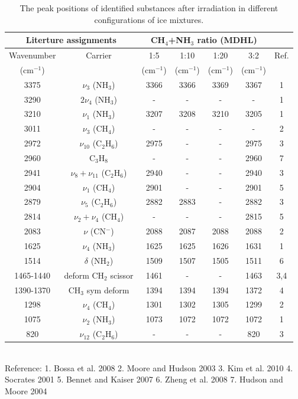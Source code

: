 \begin{table}[htbp]
\caption{The peak positions of identified substances after irradiation in different configurations of ice mixtures.}
\label{tab:WavenumberMDHL}
\begin{tabular}{ccccccc}
\hline
\hline
\multicolumn{2}{c}{Literture assignments} & \multicolumn{4}{c}{CH$_4$+NH$_3$ ratio (MDHL)} &  \\
\hline
Wavenumber & Carrier  & 1:5  & 1:10  & 1:20  & 3:2  & Ref. \\
(cm$^{-1}$) &   & (cm$^{-1}$) & (cm$^{-1}$) & (cm$^{-1}$) & (cm$^{-1}$) &\\
\hline
3375 & $\nu_3$ (NH$_3$) & 3366 & 3366 & 3369 & 3367 & 1 \\
3290 & $2\nu_4$ (NH$_3$) & - & - & - & - & 1 \\
3210 & $\nu_1$ (NH$_3$) & 3207 & 3208 & 3210 & 3205 & 1 \\
3011 & $\nu_3$ (CH$_4$) & - & - & - & - & 2 \\
2972 & $\nu_{10}$ (C$_2$H$_6$) & 2975 & - & - & 2975 & 3 \\
2960 & C$_3$H$_8$ & - & - & - & 2960 & 7 \\
2941 & $\nu_8+\nu_11$ (C$_2$H$_6$) & 2940 & - & - & 2940 & 3 \\
2904 & $\nu_1$ (CH$_4$) & 2901 & - & - & 2901 & 5 \\
2879 & $\nu_5$ (C$_2$H$_6$) & 2882 & 2883 & - & 2882 & 3 \\
2814 & $\nu_2+\nu_4$ (CH$_4$) & - & - & - & 2815 & 5 \\
2083 & $\nu$ (CN$^-$) & 2088 & 2087 & 2088 & 2088 & 2 \\
1625 & $\nu_4$ (NH$_3$) & 1625 & 1625 & 1626 & 1631 & 1 \\
1514 & $\delta$ (NH$_2$) & 1509 & 1507 & 1505 & 1511 & 6 \\
1465-1440 & deform CH$_2$ scissor & 1461 & - & - & 1463 & 3,4 \\
1390-1370 & CH$_3$ sym deform & 1394 & 1394 & 1394 & 1372 & 4 \\
1298 & $\nu_4$ (CH$_4$) & 1301 & 1302 & 1305 & 1299 & 2 \\
1075 & $\nu_2$ (NH$_3$) & 1073 & 1072 & 1072 & 1072 & 1 \\
820 & $\nu_12$ (C$_2$H$_6$) & - & - & - & 820 & 3 \\
\hline
\end{tabular}\\
Reference: 1. Bossa et al. 2008 \cite{bossa2008carbamic} 2. Moore and Hudson 2003 \cite{moore2003infrared} 3. Kim et al. 2010 \cite{kim2010abiotic} 4. Socrates 2001 \cite{socrates2001infrared} 5. Bennet and Kaiser 2007 \cite{bennett2007formation} 6. Zheng et al. 2008 \cite{zheng2008formation} 7. Hudson and Moore 2004 \cite{hudson2004reactions}
\end{table}



